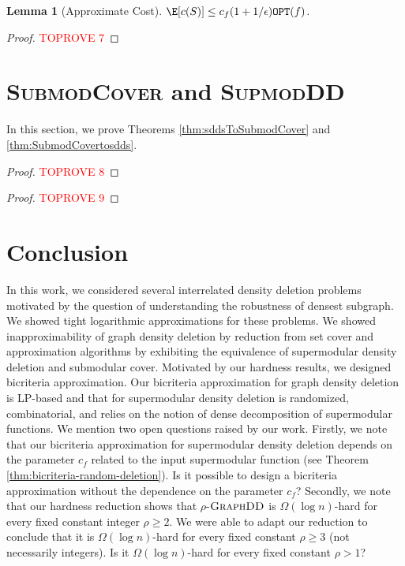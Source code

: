 \documentclass{article}
\newtheorem{lemma}{Lemma}[section]
\newcommand{\OPT}{\ensuremath{\mathtt{OPT}}\xspace}
\newcommand{\dds}{\ensuremath{\textsc{GraphDD}}\xspace}
\newcommand{\supmoddensitydeletionset}{\textsc{SupmodDD}\xspace}
\newcommand{\submodcover}{\textsc{SubmodCover}\xspace}
\begin{document}
\begin{lemma}[Approximate Cost]\label{lem:bicriteria-random-deletion:expected-cost}
    $\E[c(S)] \leq c_f(1+1/\epsilon)\OPT(f)$.
\end{lemma}
\begin{proof}\textcolor{red}{TOPROVE 7}\end{proof}  \section{\submodcover and \supmoddensitydeletionset}\label{sec:submodcover-reductions}

In this section, we prove Theorems \ref{thm:sddsToSubmodCover} and \ref{thm:SubmodCovertosdds}. 

\thmsddsToSubmodCover*
\begin{proof}\textcolor{red}{TOPROVE 8}\end{proof}

\thmSubmodCovertosdds*
\begin{proof}\textcolor{red}{TOPROVE 9}\end{proof} \section{Conclusion}\label{sec:conclusion}
In this work, we considered several interrelated density deletion problems motivated by the question of understanding the robustness of densest subgraph. We showed tight logarithmic approximations for these problems. We showed inapproximability of graph density deletion by reduction from set cover and approximation algorithms by exhibiting the equivalence of supermodular density deletion and submodular cover. Motivated by our hardness results, we designed bicriteria approximation. Our bicriteria approximation for graph density deletion is LP-based and that for supermodular density deletion is randomized, combinatorial, and relies on the notion of dense decomposition of supermodular functions. 
We mention two open questions raised by our work. Firstly, we note that our bicriteria approximation for supermodular density deletion depends on the parameter $c_f$ related to the input supermodular function (see Theorem \ref{thm:bicriteria-random-deletion}). Is it possible to design a bicriteria approximation without the dependence on the parameter $c_f$? Secondly, we note that our hardness reduction shows that $\rho$-\dds is $\Omega(\log{n})$-hard for every fixed constant integer $\rho\ge 2$. We were able to adapt our reduction to conclude that it is $\Omega(\log{n})$-hard for every fixed constant $\rho\ge 3$ (not necessarily integers). Is it $\Omega(\log{n})$-hard for every fixed constant $\rho>1$?
\end{document}
